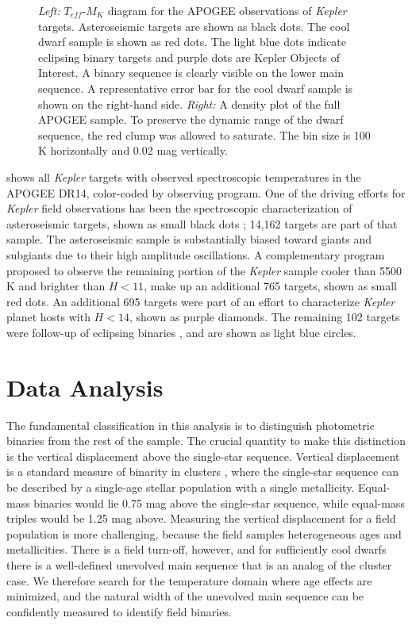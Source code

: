 \documentclass[manuscript]{aastex6}
\newcommand{\Kepler}{\mbox{\textit{Kepler}}}
\newcommand{\Teff}{\ensuremath{T_{eff}}}
\begin{document}
\begin{figure}[htb]
    \centering
    \caption{\emph{Left:} \Teff-\(M_K\) diagram for the APOGEE observations of
        \Kepler{} targets. Asteroseismic targets are shown as black dots. The
        cool dwarf sample is shown as red dots. The light blue dots indicate 
        eclipsing binary targets and purple dots are Kepler Objects of 
        Interest. A binary sequence is clearly visible on the lower main
        sequence. A representative error bar for the cool dwarf sample is 
        shown on the right-hand side. \emph{Right:} A density plot of the 
        full APOGEE sample. To preserve the dynamic range of the dwarf 
        sequence, the red clump was allowed to saturate. The bin size is 100 K
    horizontally and 0.02 mag vertically.}\label{fig:apogee_selection}
\end{figure}

 shows all \Kepler{} targets with observed
spectroscopic temperatures in the APOGEE DR14, color-coded by observing
program. One of the driving efforts for \Kepler{} field observations has been
the spectroscopic characterization of asteroseismic targets, shown as small
black dots \citep{Zasowski17,Pinsonneault18}; 14,162 targets are part of that
sample. The asteroseismic sample is substantially biased toward giants 
and subgiants due to their high amplitude oscillations. A complementary 
program proposed to observe the remaining portion of the \Kepler{} sample 
cooler than 5500 K and brighter than \(H < 11\), make up an additional 765 
targets, shown as small red dots. An additional 695 targets were part of an 
effort to characterize \Kepler{} planet hosts with \(H < 14\), shown as purple 
diamonds. The remaining 102 targets were follow-up of eclipsing binaries 
\citep{Prsa11,Slawson11}, and are shown as light blue circles.  

\section{Data Analysis}
\label{sec:analysis}

The fundamental classification in this analysis is to distinguish photometric
binaries from the rest of the sample. The crucial quantity to make this
distinction is the 
vertical displacement above the single-star sequence. Vertical 
displacement is a standard measure of binarity in clusters 
\citep{Mermilliod92}, where the single-star sequence can be described by a
single-age stellar population with a single metallicity. Equal-mass binaries
would lie 0.75 mag above the single-star sequence, while equal-mass triples would be
1.25 mag above. Measuring the vertical displacement for a field population is 
more challenging, because the
field samples heterogeneous ages and metallicities. There is a
field turn-off, however, and for sufficiently cool dwarfs there is a
well-defined unevolved main sequence that is an analog of the cluster case. We
therefore search for the temperature domain where age effects are minimized, 
and the natural width of the unevolved main sequence can be confidently
measured to identify field binaries.
\end{document}
